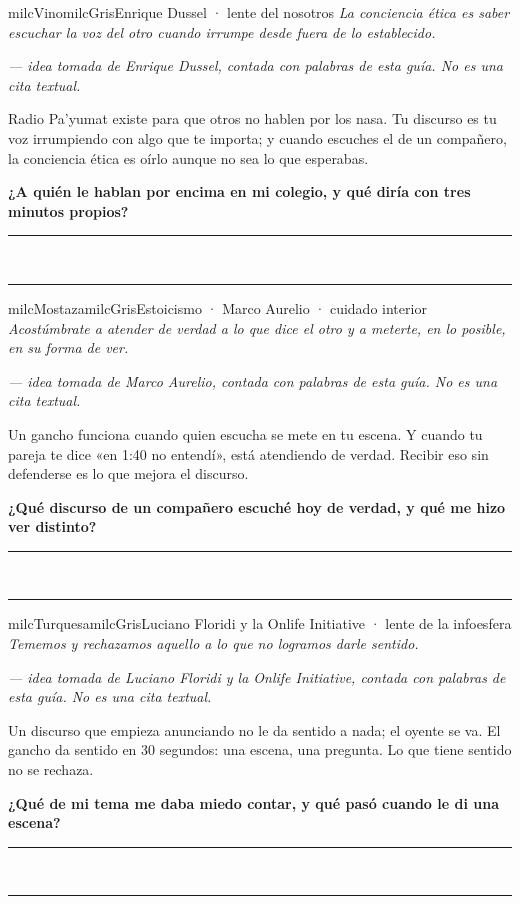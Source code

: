 \documentclass[11pt,letterpaper]{article}
\newcommand{\linead}[1]{\noindent\color{milcLinea}\rule{#1}{0.5pt}\color{milcNegro}}
\begin{document}
\begin{softbox}{milcVino}{milcGris}{Enrique Dussel · lente del nosotros}
\textit{La conciencia ética es saber escuchar la voz del otro cuando irrumpe desde fuera de lo establecido.}

{\footnotesize\itshape\color{milcNegro!70}--- idea tomada de Enrique Dussel, contada con palabras de esta guía. No es una cita textual.}

Radio Pa'yumat existe para que otros no hablen por los nasa. Tu discurso es tu voz irrumpiendo con algo que te importa; y cuando escuches el de un compañero, la conciencia ética es oírlo aunque no sea lo que esperabas.

\textbf{¿A quién le hablan por encima en mi colegio, y qué diría con tres minutos propios?}
\end{softbox}
\linead{\linewidth}\\[1mm]
\linead{\linewidth}

\begin{softbox}{milcMostaza}{milcGris}{Estoicismo · Marco Aurelio · cuidado interior}
\textit{Acostúmbrate a atender de verdad a lo que dice el otro y a meterte, en lo posible, en su forma de ver.}

{\footnotesize\itshape\color{milcNegro!70}--- idea tomada de Marco Aurelio, contada con palabras de esta guía. No es una cita textual.}

Un gancho funciona cuando quien escucha se mete en tu escena. Y cuando tu pareja te dice «en 1:40 no entendí», está atendiendo de verdad. Recibir eso sin defenderse es lo que mejora el discurso.

\textbf{¿Qué discurso de un compañero escuché hoy de verdad, y qué me hizo ver distinto?}
\end{softbox}
\linead{\linewidth}\\[1mm]
\linead{\linewidth}

\begin{softbox}{milcTurquesa}{milcGris}{Luciano Floridi y la Onlife Initiative · lente de la infoesfera}
\textit{Tememos y rechazamos aquello a lo que no logramos darle sentido.}

{\footnotesize\itshape\color{milcNegro!70}--- idea tomada de Luciano Floridi y la Onlife Initiative, contada con palabras de esta guía. No es una cita textual.}

Un discurso que empieza anunciando no le da sentido a nada; el oyente se va. El gancho da sentido en 30 segundos: una escena, una pregunta. Lo que tiene sentido no se rechaza.

\textbf{¿Qué de mi tema me daba miedo contar, y qué pasó cuando le di una escena?}
\end{softbox}
\linead{\linewidth}\\[1mm]
\linead{\linewidth}
\end{document}

